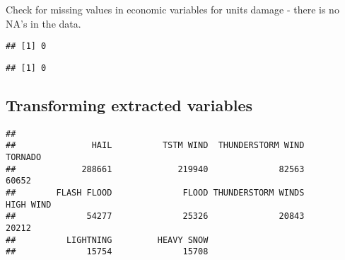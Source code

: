 \documentclass[
]{article}
\newenvironment{Shaded}{\begin{snugshade}}{\end{snugshade}}
\newcommand{\DataTypeTok}[1]{\textcolor[rgb]{0.13,0.29,0.53}{#1}}
\newcommand{\DecValTok}[1]{\textcolor[rgb]{0.00,0.00,0.81}{#1}}
\newcommand{\KeywordTok}[1]{\textcolor[rgb]{0.13,0.29,0.53}{\textbf{#1}}}
\newcommand{\NormalTok}[1]{#1}
\newcommand{\OperatorTok}[1]{\textcolor[rgb]{0.81,0.36,0.00}{\textbf{#1}}}
\newcommand{\OtherTok}[1]{\textcolor[rgb]{0.56,0.35,0.01}{#1}}
\begin{document}
Check for missing values in economic variables for units damage - there
is no NA's in the data.

\begin{Shaded}
\end{Shaded}

\begin{verbatim}
## [1] 0
\end{verbatim}

\begin{Shaded}
\end{Shaded}

\begin{verbatim}
## [1] 0
\end{verbatim}

\hypertarget{transforming-extracted-variables}{%
\subsection{Transforming extracted
variables}\label{transforming-extracted-variables}}

\begin{Shaded}
\end{Shaded}

\begin{verbatim}
## 
##               HAIL          TSTM WIND  THUNDERSTORM WIND            TORNADO 
##             288661             219940              82563              60652 
##        FLASH FLOOD              FLOOD THUNDERSTORM WINDS          HIGH WIND 
##              54277              25326              20843              20212 
##          LIGHTNING         HEAVY SNOW 
##              15754              15708
\end{verbatim}
\end{document}
